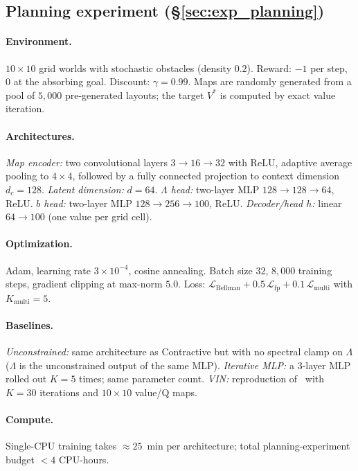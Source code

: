\documentclass{article}
\begin{document}
\subsection{Planning experiment (\S\ref{sec:exp_planning})}
\label{app:planning}

\paragraph{Environment.}
$10\!\times\!10$ grid worlds with stochastic obstacles (density $0.2$).
Reward: $-1$ per step, $0$ at the absorbing goal.
Discount: $\gamma = 0.99$.
Maps are randomly generated from a pool of $5{,}000$ pre-generated layouts; the
target $V^*$ is computed by exact value iteration.

\paragraph{Architectures.}
\emph{Map encoder:} two convolutional layers $3\!\to\!16\!\to\!32$ with ReLU,
adaptive average pooling to $4\!\times\!4$, followed by a fully connected
projection to context dimension $d_c = 128$.
\emph{Latent dimension:} $d = 64$.
\emph{$\Lambda$ head:} two-layer MLP $128 \!\to\! 128 \!\to\! 64$, ReLU.
\emph{$b$ head:} two-layer MLP $128 \!\to\! 256 \!\to\! 100$, ReLU.
\emph{Decoder/head $h$:} linear $64 \!\to\! 100$ (one value per grid cell).

\paragraph{Optimization.}
Adam, learning rate $3 \times 10^{-4}$, cosine annealing.
Batch size $32$, $8{,}000$ training steps, gradient clipping at max-norm $5.0$.
Loss: $\mathcal{L}_\text{Bellman} + 0.5\,\mathcal{L}_\text{fp} +
0.1\,\mathcal{L}_\text{multi}$ with $K_\text{multi}=5$.

\paragraph{Baselines.}
\emph{Unconstrained:} same architecture as Contractive but with no spectral
clamp on $\Lambda$ ($\Lambda$ is the unconstrained output of the same MLP).
\emph{Iterative MLP:} a 3-layer MLP rolled out $K=5$ times; same parameter
count.
\emph{VIN:} reproduction of~\citet{tamar2016value} with $K = 30$ iterations and
$10\times10$ value/Q maps.

\paragraph{Compute.}
Single-CPU training takes $\approx 25$~min per architecture; total
planning-experiment budget $<\!\!4$ CPU-hours.
\end{document}
